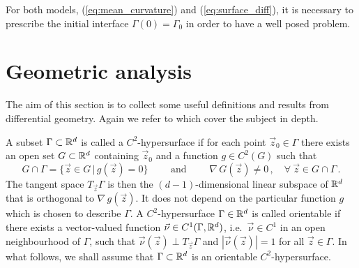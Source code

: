 For both models, (\ref{eq:mean_curvature}) and (\ref{eq:surface_diff}), it is
necessary to prescribe the initial interface $\Gamma(0)=\Gamma_0$ in order to
have a well posed problem.

\section{Geometric analysis}\label{sec:geometric_analysis}
The aim of this section is to collect some useful definitions and results from
differential geometry. Again we refer to \cite{DeckelnickDE05} which cover the
subject in depth.

A subset $\Gamma \subset {\mathbb R}^d$ is called a $C^2$-hypersurface if for each point
$\vec z_0 \in \Gamma$ there exists an open set $G \subset {\mathbb R}^d$ containing
$\vec z_0$ and a function $g \in C^2(G)$ such that
\begin{equation}
G \cap \Gamma = \{ \vec z \in G \, | \, g(\vec z) = 0 \}
\qquad \mbox{ and } \qquad \nabla \, G(\vec z) \neq 0\,,
\quad \forall\ \vec z \in G \cap \Gamma \, .
\end{equation}
The tangent space $T_{\vec z} \Gamma$ is then the $(d-1)$-dimensional linear
subspace of ${\mathbb R}^d$ that is orthogonal to $\nabla \, g(\vec z)$. It does not
depend on the particular function $g$ which is chosen to describe $\Gamma$. A
$C^2$-hypersurface $\Gamma \in {\mathbb R}^d$ is called orientable if there exists a
vector-valued function $\vec\nu \in C^1(\Gamma, {\mathbb R}^d)$, i.e.~$\vec\nu \in C^1$
in an open neighbourhood of $\Gamma$, such that $\vec\nu(\vec z) \perp T_{\vec
z} \Gamma$ and $|\vec{\nu}(\vec z)| = 1$ for all $\vec z \in \Gamma$. In what
follows, we shall assume that $\Gamma \subset {\mathbb R}^d$ is an orientable
$C^2$-hypersurface.

